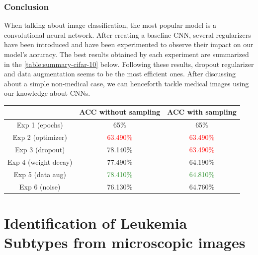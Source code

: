 \documentclass[11pt, openany]{report}
\theoremstyle{plain}
\theoremstyle{definition}
\theoremstyle{remark}
\begin{document}
\subsection{Conclusion}
When talking about image classification, the most popular model is a convolutional neural network. After creating a baseline CNN, several regularizers have been introduced and have been experimented to observe their impact on our model's accuracy. The best results obtained by each experiment are summarized in the \autoref{table:summary-cifar-10} below. Following these results, dropout regularizer and data augmentation seems to be the most efficient ones. After discussing about a simple non-medical case, we can henceforth tackle medical images using our knowledge about CNNs. 

\begin{center}
\begin{tabular}{|c|c|c|}
  \hline
          & \textbf{ACC without sampling} & \textbf{ACC with sampling} \\
  \hline
  Exp 1 (epochs) & 65\% & 65\% \\
  \hline
  Exp 2 (optimizer) & \textcolor{red}{63.490\%} & \textcolor{red}{63.490\%}  \\ 
  \hline
  Exp 3 (dropout) & 78.140\% & \textcolor{red}{63.490\%} \\
  \hline
  Exp 4 (weight decay) & 77.490\% & 64.190\%  \\ 
  \hline 
  Exp 5 (data aug) & \textcolor{ForestGreen}{78.410\%} & \textcolor{ForestGreen}{64.810\%} \\
  \hline
  Exp 6 (noise) & 76.130\% & 64.760\% \\
  \hline
\end{tabular}
\label{table:summary-cifar-10}
\end{center}


\chapter{Identification of Leukemia Subtypes from microscopic images}
\end{document}
